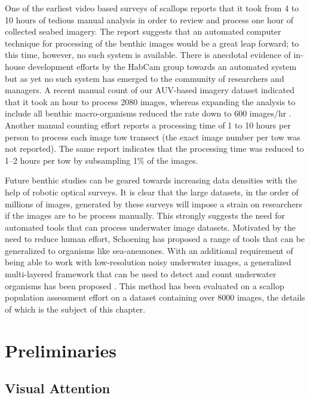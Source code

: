 One of the earliest video based surveys of scallops \cite{rosenkratz} reports that
it took from 4 to 10 hours of tedious manual analysis in order to review and process one hour
of collected seabed imagery. The report suggests that an automated computer technique for
processing of the benthic images would be a great leap forward; to this time, however, no
such system is available. There is anecdotal evidence of in-house development efforts by the
HabCam group \cite{gallager} towards an automated system but as yet no such
system has emerged to the community of researchers and managers. A recent manual count
of our AUV-based imagery dataset indicated that it took an hour to process 2080 images,
whereas expanding the analysis to include all benthic macro-organisms reduced the rate
down to 600 images/hr \cite{walker}. Another manual counting effort \cite{oremland} 
reports a processing time of 1 to 10 hours per person to process each image tow
transect (the exact image number per tow was not reported). The same report indicates that
the processing time was reduced to 1–2 hours per tow by subsampling 1\% of the images.

Future benthic studies can be geared towards increasing data densities with the help of robotic optical surveys.
It is clear that the large datasets, in the order of millions of images, generated by these surveys will impose 
a strain on researchers if the images are to be process manually. This strongly suggests the need for automated tools
that can process underwater image datasets. Motivated by the need to reduce human effort, Schoening \cite{schoening} has proposed a range of tools that
can be generalized to organisms like sea-anemones. With an additional requirement of being able to work with low-resolution noisy underwater images, 
a generalized multi-layered framework that can be used to detect and count underwater organisms has been proposed \cite{prasanna_med, prasanna_aslo, prasanna_igi}. This method has been evaluated on a scallop population assessment effort on a dataset containing over 8000 images, the details of which is the subject of this chapter.

\section{Preliminaries}

\subsection{Visual Attention}
\label{sec:visual_attn}

